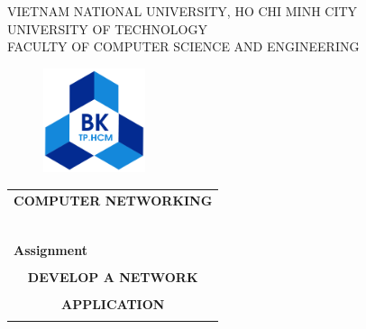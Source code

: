 \documentclass[a4paper]{article}
\begin{document}
\begin{spacing}{1.3}

    \begin{titlepage}
        \begin{center}
            VIETNAM NATIONAL UNIVERSITY, HO CHI MINH CITY \\
            UNIVERSITY OF TECHNOLOGY \\
            FACULTY OF COMPUTER SCIENCE AND ENGINEERING
        \end{center}

        \vspace{1cm}

        \begin{figure}[h!]
            \begin{center}
                \includegraphics[width=3cm]{Images/hcmut.png}
            \end{center}
        \end{figure}

        \vspace{1cm}


        \begin{center}
            \begin{tabular}{c}
                \multicolumn{1}{l}{\textbf{{\Large COMPUTER NETWORKING}}} \\
                ~~                                                     \\
                \hline
                \\
                \multicolumn{1}{l}{\textbf{{\Large Assignment}}}       \\
                \\
                \textbf{{\Huge DEVELOP A NETWORK}}        \\
                \\
                \textbf{{\Huge APPLICATION}}        \\
                \\
                \hline
            \end{tabular}
        \end{center}


\end{titlepage}
\end{spacing}
\end{document}
